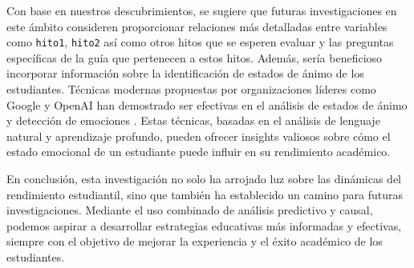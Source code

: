 Con base en nuestros descubrimientos, se sugiere que futuras investigaciones en este ámbito consideren proporcionar relaciones más detalladas entre variables como \texttt{hito1}, \texttt{hito2} así como otros hitos que se esperen evaluar y las preguntas específicas de la guía que pertenecen a estos hitos. Además, sería beneficioso incorporar información sobre la identificación de estados de ánimo de los estudiantes. Técnicas modernas propuestas por organizaciones líderes como Google y OpenAI han demostrado ser efectivas en el análisis de estados de ánimo y detección de emociones \cite{google_mood_tracking_2022, google_sentiment_api_2022, openai_sentiment_neuron_2022, openai_sentiment_analysis_2022, openai_gpt_emotion_2022, openai_chatgpt_emotion_2023}. Estas técnicas, basadas en el análisis de lenguaje natural y aprendizaje profundo, pueden ofrecer insights valiosos sobre cómo el estado emocional de un estudiante puede influir en su rendimiento académico.

En conclusión, esta investigación no solo ha arrojado luz sobre las dinámicas del rendimiento estudiantil, sino que también ha establecido un camino para futuras investigaciones. Mediante el uso combinado de análisis predictivo y causal, podemos aspirar a desarrollar estrategias educativas más informadas y efectivas, siempre con el objetivo de mejorar la experiencia y el éxito académico de los estudiantes.
